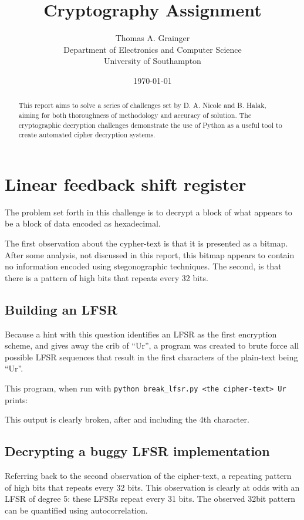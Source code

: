 \documentclass[pdftex, 12pt, a4paper]{article}
\title{Cryptography Assignment}
\author{
        Thomas A. Grainger \\
                Department of Electronics and Computer Science\\
        University of Southampton\\
}
\date{\today}
\begin{document}
\maketitle

\begin{abstract}
This report aims to solve a series of challenges set by D. A. Nicole and B. Halak\cite{instructions}, aiming for both thoroughness of methodology and accuracy of solution.  The cryptographic decryption challenges demonstrate the use of Python as a useful tool to create automated cipher decryption systems.
\end{abstract}

\tableofcontents

\section{Linear feedback shift register}

The problem set forth in this challenge is to decrypt a block of what appears to be a block of data encoded as hexadecimal.

The first observation about the cypher-text is that it is presented as a bitmap. After some analysis, not discussed in this report, this bitmap appears to contain no information encoded using stegonographic techniques.  The second, is that there is a pattern of high bits that repeats every 32 bits.

\subsection{Building an LFSR}
Because a hint with this question identifies an LFSR as the first encryption scheme, and gives away the crib of ``Ur'', a program was created to brute force all possible LFSR sequences that result in the first characters of the plain-text being ``Ur''.



This program, when run with \verb`python break_lfsr.py <the cipher-text> Ur` prints:


This output is clearly broken, after and including the 4th character.

\subsection{Decrypting a buggy LFSR implementation}
Referring back to the second observation of the cipher-text, a repeating pattern of high bits that repeats every 32 bits. This observation is clearly at odds with an LFSR of degree 5: these LFSRs repeat every 31 bits. The observed 32bit pattern can be quantified using autocorrelation.
\end{document}
